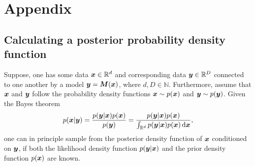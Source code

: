 \documentclass[a4paper,12pt]{report}
\begin{document}
\chapter{Appendix}
\section{Calculating a posterior probability density function}\label{sec:MCMCsim}
Suppose, one has some data $\bm{x}\in \mathbb{R}^d$ and corresponding data $\bm{y} \in \mathbb{R}^D$ connected to one another by a model $\bm{y} = \bm{M}(\bm{x})$, where $d,D \in\mathbb{N}$. Furthermore, assume that $\bm{x}$ and $\bm{y}$ follow the probability density functions $\bm{x} \sim p(\bm{x})$ and $\bm{y} \sim p(\bm{y})$. Given the Bayes theorem \begin{align}\begin{aligned}
p(\bm{x}|\bm{y}) = \frac{p(\bm{y}|\bm{x})p(\bm{x})}{p(\bm{y})} = \frac{p(\bm{y}|\bm{x})p(\bm{x})}{\int_{\mathbb{R}^d} p(\bm{y}|\bm{x})p(\bm{x}) \,\mathrm{d}\bm{x}},
\end{aligned}\end{align} one can in principle sample from the posterior density function of $\bm{x}$ conditioned on $\bm{y}$, if both the likelihood density function $p(\bm{y}|\bm{x})$ and the prior density function $p(\bm{x})$ are known.
\end{document}

